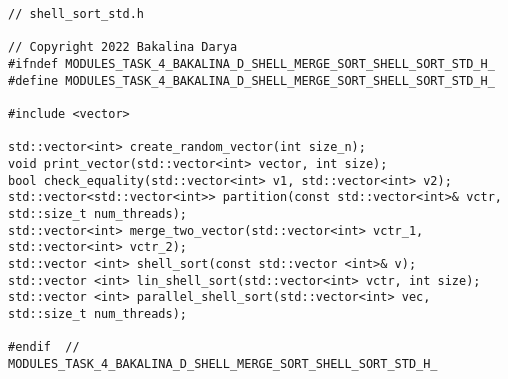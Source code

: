 \documentclass{report}
\begin{document}
\begin{lstlisting}
// shell_sort_std.h

// Copyright 2022 Bakalina Darya
#ifndef MODULES_TASK_4_BAKALINA_D_SHELL_MERGE_SORT_SHELL_SORT_STD_H_
#define MODULES_TASK_4_BAKALINA_D_SHELL_MERGE_SORT_SHELL_SORT_STD_H_

#include <vector>

std::vector<int> create_random_vector(int size_n);
void print_vector(std::vector<int> vector, int size);
bool check_equality(std::vector<int> v1, std::vector<int> v2);
std::vector<std::vector<int>> partition(const std::vector<int>& vctr, std::size_t num_threads);
std::vector<int> merge_two_vector(std::vector<int> vctr_1, std::vector<int> vctr_2);
std::vector <int> shell_sort(const std::vector <int>& v);
std::vector <int> lin_shell_sort(std::vector<int> vctr, int size);
std::vector <int> parallel_shell_sort(std::vector<int> vec, std::size_t num_threads);

#endif  // MODULES_TASK_4_BAKALINA_D_SHELL_MERGE_SORT_SHELL_SORT_STD_H_
\end{lstlisting}
\end{document}
